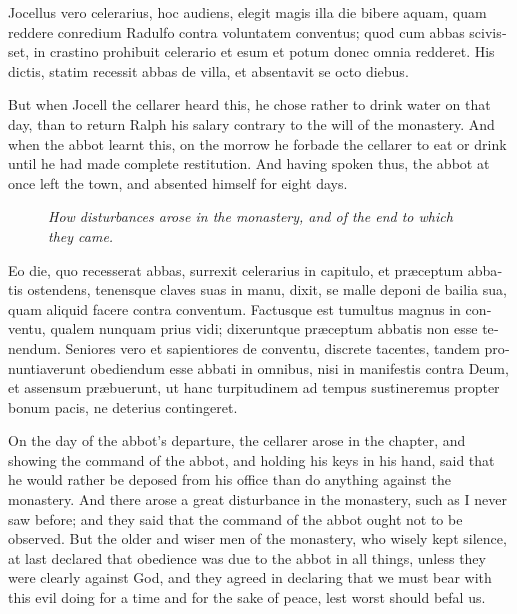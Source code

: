 \documentclass{book}
\newcommand{\blockhead}[4][]{
\begin{figure}
\centering
\vspace{#4}
\parbox{2.75cm}{\begin{center}\footnotesize \color{BrickRed} \emph{#2}\\ #1 \end{center}}
\end{figure}
}
\begin{document}
\begin{paracol}{2}
\switchcolumn*

\begin{otherlanguage}{latin}
Jocellus vero celerarius, hoc audiens, elegit magis illa die bibere aquam, quam reddere conredium Radulfo contra voluntatem conventus; quod cum abbas scivisset, in crastino prohibuit celerario et esum et potum donec omnia redderet. His dictis, statim recessit abbas de villa, et absentavit se octo diebus.
\end{otherlanguage}

\switchcolumn

But when Jocell the cellarer heard this, he chose rather to drink water on that day, than to return Ralph his salary contrary to the will of the monastery. And when the abbot learnt this, on the morrow he forbade the cellarer to eat or drink until he had made complete restitution. And having spoken thus, the abbot at once left the town, and absented himself for eight days.

\switchcolumn*

\begin{otherlanguage}{latin}
\blockhead{How disturbances arose in the monastery, and of the end to which they came.}{4}{-.45cm}
Eo die, quo recesserat abbas, surrexit celerarius in capitulo, et pr\ae{}ceptum abbatis ostendens, tenensque claves suas in manu, dixit, se malle deponi de bailia sua, quam aliquid facere contra conventum. Factusque est tumultus magnus in conventu, qualem nunquam prius vidi; dixeruntque pr\ae{}ceptum abbatis non esse tenendum. Seniores vero et sapientiores de conventu, discrete tacentes, tandem pronuntiaverunt obediendum esse abbati in omnibus, nisi in manifestis contra Deum, et assensum pr\ae{}buerunt, ut hanc turpitudinem ad tempus sustineremus propter bonum pacis, ne deterius contingeret. 

\end{otherlanguage}

\switchcolumn

On the day of the abbot's departure, the cellarer arose in the chapter, and showing the command of the abbot, and holding his keys in his hand, said that he would rather be deposed from his office than do anything against the monastery. And there arose a great disturbance in the monastery, such as I never saw before; and they said that the command of the abbot ought not to be observed. But the older and wiser men of the monastery, who wisely kept silence, at last declared that obedience was due to the abbot in all things, unless they were clearly against God, and they agreed in declaring that we must bear with this evil doing for a time and for the sake of peace, lest worst should befal us.


\end{paracol}
\end{document}

